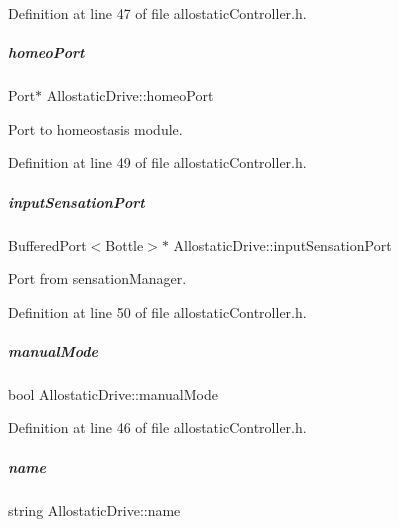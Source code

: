 Definition at line 47 of file allostatic\+Controller.\+h.

\mbox{\label{group__allostaticController_a1f2c6a7f4f35d01061381569f98b2a1e}} 
\subparagraph{\texorpdfstring{homeo\+Port}{homeoPort}}
{\footnotesize\ttfamily Port$\ast$ Allostatic\+Drive\+::homeo\+Port}



Port to homeostasis module. 



Definition at line 49 of file allostatic\+Controller.\+h.

\mbox{\label{group__allostaticController_a09a6b2f056f2b4517e6a338f499fa9c1}} 
\subparagraph{\texorpdfstring{input\+Sensation\+Port}{inputSensationPort}}
{\footnotesize\ttfamily Buffered\+Port$<$Bottle$>$$\ast$ Allostatic\+Drive\+::input\+Sensation\+Port}



Port from sensation\+Manager. 



Definition at line 50 of file allostatic\+Controller.\+h.

\mbox{\label{group__allostaticController_a6c346cb58e92a490c784e1e637529d50}} 
\subparagraph{\texorpdfstring{manual\+Mode}{manualMode}}
{\footnotesize\ttfamily bool Allostatic\+Drive\+::manual\+Mode}



Definition at line 46 of file allostatic\+Controller.\+h.

\mbox{\label{group__allostaticController_abd23f5c821ac78b4bfd55377f73d6d94}} 
\subparagraph{\texorpdfstring{name}{name}}
{\footnotesize\ttfamily string Allostatic\+Drive\+::name}



